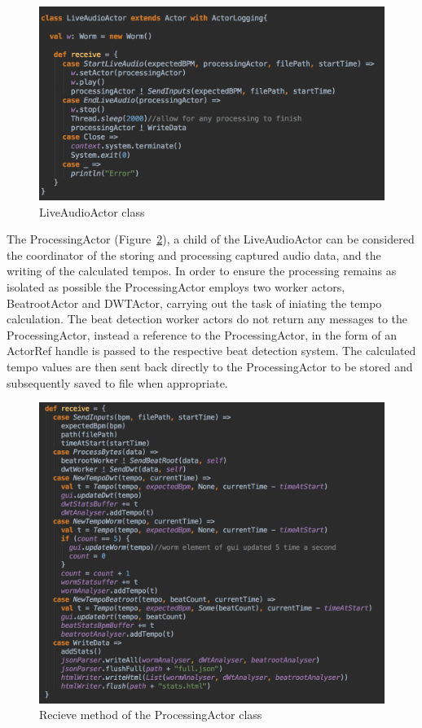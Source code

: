 \documentclass[a4paper, 11pt]{article}
\begin{document}
\begin{figure}[htbp]
\centering
\includegraphics[scale=0.3]{images/LiveAudioActor.jpg}
\caption{LiveAudioActor class}
\label{fig: liveaudioactor}
\end{figure}

The ProcessingActor (Figure~\ref{fig: processingActor}), a child of the LiveAudioActor can be considered the coordinator of the storing and processing captured audio data, and the writing of the calculated tempos. In order to ensure the processing remains as isolated as possible the ProcessingActor employs two worker actors, BeatrootActor and DWTActor, carrying out the task of iniating the tempo calculation. The beat detection worker actors do not return any messages to the ProcessingActor, instead a reference to the ProcessingActor, in the form of an ActorRef handle is passed to the respective beat detection system. The calculated tempo values are then sent back directly to the ProcessingActor to be stored and subsequently saved to file when appropriate.\par

\begin{figure}
\centering
\includegraphics[scale=0.3]{images/processingRec.jpg}
\caption{Recieve method of the ProcessingActor class}
\label{fig: processingActor}
\end{figure}
\end{document}

